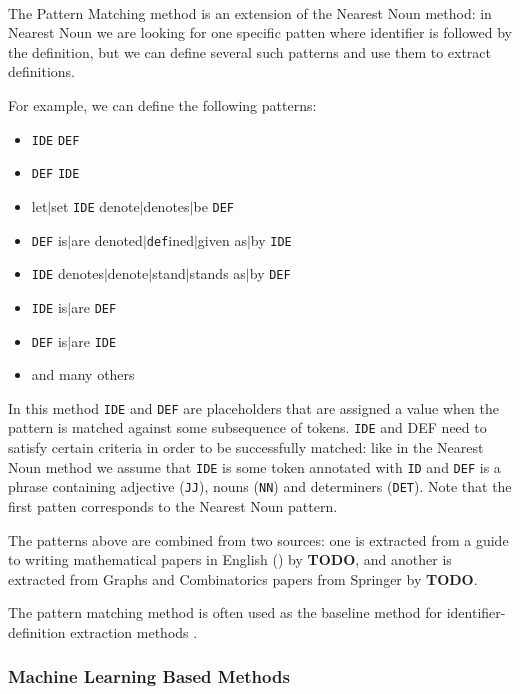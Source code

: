 \ \\

The Pattern Matching method \cite{quoc2010mining} is an extension of the 
Nearest Noun method: in Nearest Noun we are looking for one specific patten 
where identifier is followed by the definition, but we can define several such 
patterns and use them to extract definitions. 

For example, we can define the following patterns:

\begin{itemize}
\itemsep1pt\parskip0pt
  \item \texttt{IDE} \texttt{DEF}
  \item \texttt{DEF} \texttt{IDE}
  \item let$|$set \texttt{IDE} denote$|$denotes$|$be \texttt{DEF}
  \item \texttt{DEF} is$|$are denoted$|$\texttt{def}ined$|$given as$|$by \texttt{IDE}
  \item \texttt{IDE} denotes$|$denote$|$stand$|$stands as$|$by \texttt{DEF}
  \item \texttt{IDE} is$|$are \texttt{DEF}
  \item \texttt{DEF} is$|$are \texttt{IDE}
  \item and many others
\end{itemize}


In this method \texttt{IDE} and \texttt{DEF} are placeholders that are 
assigned a value when the pattern is matched against some subsequence 
of tokens.  \texttt{IDE} and DEF need to 
satisfy certain criteria in order to be successfully matched: like in the 
Nearest Noun method we assume that \texttt{IDE} is some token annotated with 
\texttt{ID} and \texttt{DEF} is a phrase containing adjective (\texttt{JJ}), 
nouns (\texttt{NN}) and  determiners (\texttt{DET}). Note that the first patten corresponds 
to the Nearest Noun pattern.

The patterns above are combined from two sources: one 
is extracted from a guide to writing mathematical papers in English 
(\cite{trzeciak1995writing}) by \textbf{TODO}, and another 
is extracted from Graphs and Combinatorics papers from Springer 
by \textbf{TODO}. 


The pattern matching method is often used as the baseline method 
for identifier-definition extraction methods \cite{kristianto2012extracting}
\cite{kristianto2014extracting} \cite{pagael2014mlp}.


\subsubsection{Machine Learning Based Methods}

